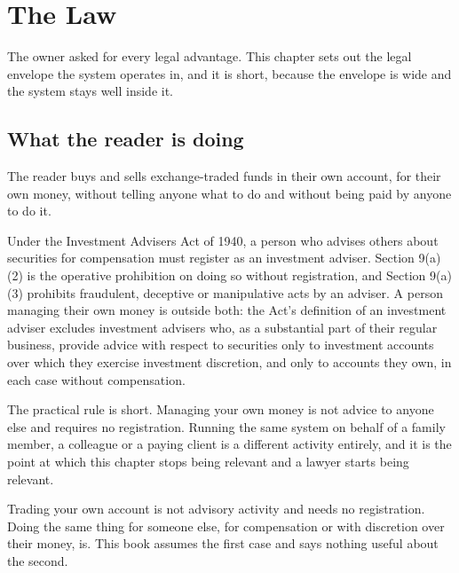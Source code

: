 
\chapter{The Law}
\label{ch:law}

The owner asked for every legal advantage. This chapter sets out the legal
envelope the system operates in, and it is short, because the envelope is
wide and the system stays well inside it.

\section{What the reader is doing}

The reader buys and sells exchange-traded funds in their own account, for
their own money, without telling anyone what to do and without being paid
by anyone to do it.

Under the Investment Advisers Act of 1940, a person who advises others
about securities for compensation must register as an investment adviser.
Section 9(a)(2) is the operative prohibition on doing so without
registration, and Section 9(a)(3) prohibits fraudulent, deceptive or
manipulative acts by an adviser. A person managing their own money is
outside both: the Act's definition of an investment adviser excludes
investment advisers who, as a substantial part of their regular business,
provide advice with respect to securities only to investment accounts
over which they exercise investment discretion, and only to accounts they
own, in each case without compensation.

The practical rule is short. Managing your own money is not advice to
anyone else and requires no registration. Running the same system on
behalf of a family member, a colleague or a paying client is a different
activity entirely, and it is the point at which this chapter stops being
relevant and a lawyer starts being relevant.

\begin{takeaway}
Trading your own account is not advisory activity and needs no
registration. Doing the same thing for someone else, for compensation or
with discretion over their money, is. This book assumes the first case and
says nothing useful about the second.
\end{takeaway}

